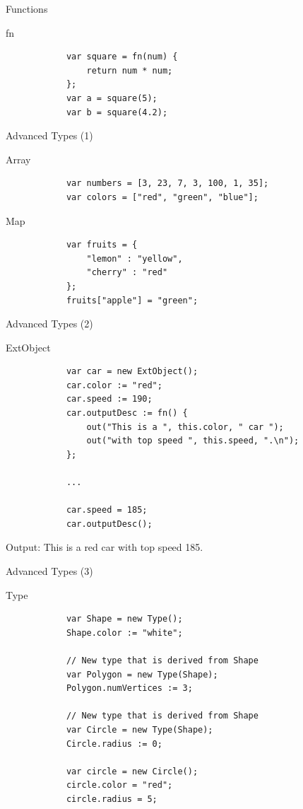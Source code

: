 \documentclass[ucs,9pt]{beamer}
\begin{document}
\begin{frame}[fragile]{Functions}
	\begin{block}{fn}
		\begin{lstlisting}
			var square = fn(num) {
			    return num * num;
			};
			var a = square(5);
			var b = square(4.2);
		\end{lstlisting}
	\end{block}
\end{frame}

\begin{frame}[fragile]{Advanced Types (1)}
	\begin{block}{Array}
		\begin{lstlisting}
			var numbers = [3, 23, 7, 3, 100, 1, 35];
			var colors = ["red", "green", "blue"];
		\end{lstlisting}
	\end{block}
	\begin{block}{Map}
		\begin{lstlisting}
			var fruits = {
			    "lemon" : "yellow",
			    "cherry" : "red"
			};
			fruits["apple"] = "green";
		\end{lstlisting}
	\end{block}
\end{frame}

\begin{frame}[fragile]{Advanced Types (2)}
	\begin{block}{ExtObject}
		\begin{lstlisting}
			var car = new ExtObject();
			car.color := "red";
			car.speed := 190;
			car.outputDesc := fn() {
			    out("This is a ", this.color, " car ");
			    out("with top speed ", this.speed, ".\n");
			};

			...

			car.speed = 185;
			car.outputDesc();
		\end{lstlisting}
	\end{block}
	Output: This is a red car with top speed 185.
\end{frame}

\begin{frame}[fragile]{Advanced Types (3)}
	\begin{block}{Type}
		\begin{lstlisting}
			var Shape = new Type();
			Shape.color := "white";

			// New type that is derived from Shape
			var Polygon = new Type(Shape); 
			Polygon.numVertices := 3;

			// New type that is derived from Shape
			var Circle = new Type(Shape); 
			Circle.radius := 0;

			var circle = new Circle();
			circle.color = "red";
			circle.radius = 5;
		\end{lstlisting}
	\end{block}
\end{frame}
 
\end{document}
